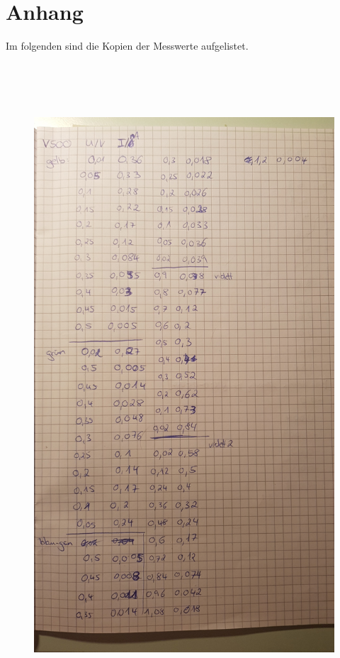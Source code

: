 \section{Anhang}
\label{Anhang}
Im folgenden sind die Kopien der Messwerte aufgelistet.

\begin{figure}[H]
  \centering
  \includegraphics[height=24cm]{1.jpg}
\end{figure}

